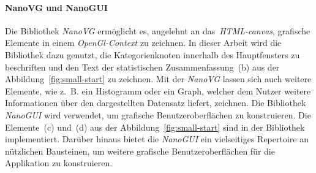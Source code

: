 \paragraph{NanoVG und NanoGUI}
Die Bibliothek \emph{NanoVG} \cite{nanovg} ermöglicht es, angelehnt an das~\emph{HTML-canvas}, grafische Elemente in einem \emph{OpenGl-Context} zu zeichnen.
In dieser Arbeit wird die Bibliothek dazu genutzt, die Kategorienknoten innerhalb des Hauptfensters zu beschriften und den Text der statistischen Zusammenfassung~(b) aus der Abbildung~\ref{fig:small-start} zu zeichnen.
Mit der \emph{NanoVG} lassen sich auch weitere Elemente, wie z.~B. ein Histogramm oder ein Graph, welcher dem Nutzer weitere Informationen über den dargestellten Datensatz liefert, zeichnen.
Die Bibliothek \emph{NanoGUI} \cite{nanogui} wird verwendet, um grafische Benutzeroberflächen zu konstruieren.
Die Elemente~(c) und~(d) aus der Abbildung~\ref{fig:small-start} sind in der Bibliothek implementiert.
Darüber hinaus bietet die \emph{NanoGUI} ein vielseitiges Repertoire an nützlichen Bausteinen, um weitere grafische Benutzeroberflächen für die Applikation zu konstruieren.
